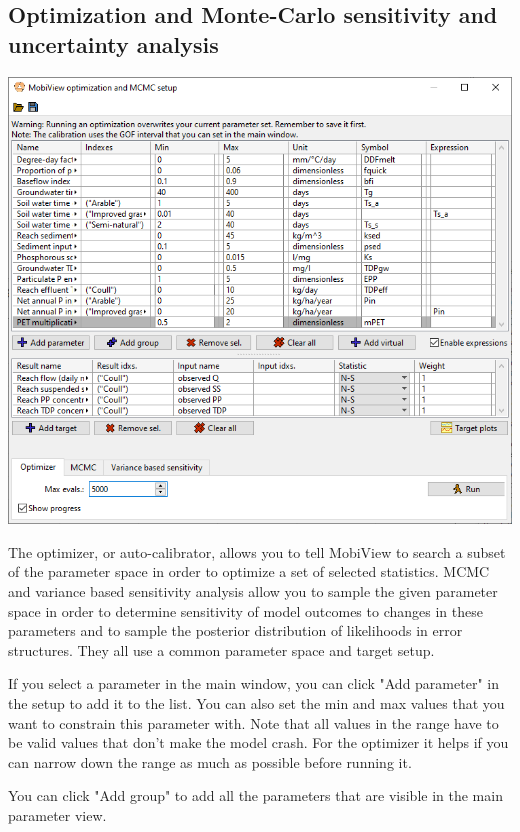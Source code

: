 \documentclass[11pt]{article}
\theoremstyle{definition}
\begin{document}
\subsection{Optimization and Monte-Carlo sensitivity and uncertainty analysis}\label{sec:optimization}

\begin{center}
\includegraphics[width=\linewidth]{img/mobiview_optimizer}
\end{center}

The optimizer, or auto-calibrator, allows you to tell MobiView to search a subset of the parameter space in order to optimize a set of selected statistics. MCMC and variance based sensitivity analysis allow you to sample the given parameter space in order to determine sensitivity of model outcomes to changes in these parameters and to sample the posterior distribution of likelihoods in error structures. They all use a common parameter space and target setup.

If you select a parameter in the main window, you can click "Add parameter" in the setup to add it to the list. You can also set the min and max values that you want to constrain this parameter with. Note that all values in the range have to be valid values that don't make the model crash. For the optimizer it helps if you can narrow down the range as much as possible before running it.

You can click "Add group" to add all the parameters that are visible in the main parameter view.
\end{document}
